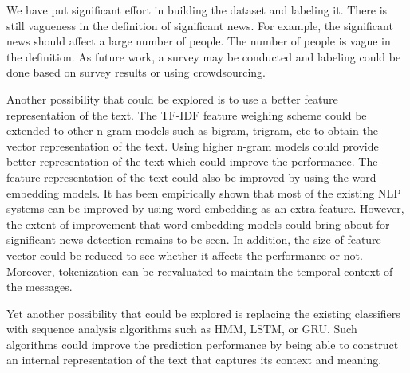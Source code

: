 We have put significant effort in building the dataset and labeling it. There is still vagueness in the definition of significant news. For example, the significant news should affect a large number of people. The number of people is vague in the definition. As future work, a survey may be conducted and labeling could be done based on survey results or using crowdsourcing. 

Another possibility that could be explored is to use a better feature representation of the text. The TF-IDF feature weighing scheme could be extended to other n-gram models such as bigram, trigram, etc to obtain the vector representation of the text. Using higher n-gram models could provide better representation of the text which could improve the performance. The feature representation of the text could also be improved by using the word embedding models. It has been empirically shown that most of the existing NLP systems can be improved by using word-embedding as an extra feature\cite{turian2010word}. However, the extent of improvement that word-embedding models could bring about for significant news detection remains to be seen. In addition, the size of feature vector could be reduced to see whether it affects the performance or not. Moreover, tokenization can be reevaluated to maintain the temporal context of the messages. 

Yet another possibility that could be explored is replacing the existing classifiers with sequence analysis algorithms such as HMM\cite{baum1966statistical}, LSTM\cite{hochreiter1997long}, or GRU\cite{cho2014learning}. Such algorithms could improve the prediction performance by being able to construct an internal representation of the text that captures its context and meaning.
